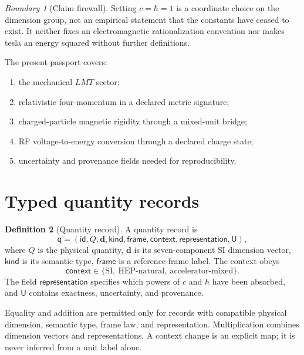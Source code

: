 \documentclass[11pt,a4paper]{article}
\theoremstyle{definition}
\newtheorem{definition}{Definition}[section]
\theoremstyle{plain}
\theoremstyle{remark}
\newtheorem{warning}[definition]{Boundary}
\newcommand{\SI}{\mathrm{SI}}
\newcommand{\HEP}{\mathrm{HEP}}
\begin{document}
\begin{warning}[Claim firewall]
Setting \(c=\hbar=1\) is a coordinate choice on the dimension group,
not an empirical statement that the constants have ceased to exist.
It neither fixes an electromagnetic rationalization convention nor
makes tesla an energy squared without further definitions.
\end{warning}

The present passport covers:
\begin{enumerate}[label=(\roman*)]
  \item the mechanical \(LMT\) sector;
  \item relativistic four-momentum in a declared metric signature;
  \item charged-particle magnetic rigidity through a mixed-unit bridge;
  \item RF voltage-to-energy conversion through a declared charge state;
  \item uncertainty and provenance fields needed for reproducibility.
\end{enumerate}

\section{Typed quantity records}

\begin{definition}[Quantity record]
A quantity record is
\[
\mathsf q=
(\mathsf{id},Q,\bm d,\mathsf{kind},\mathsf{frame},
 \mathsf{context},\mathsf{representation},\mathsf U),
\]
where \(Q\) is the physical quantity, \(\bm d\) is its seven-component
SI dimension vector, \(\mathsf{kind}\) is its semantic type,
\(\mathsf{frame}\) is a reference-frame label. The context obeys
\[
\mathsf{context}\in
\{\SI,\ \HEP\text{-natural},\ \text{accelerator-mixed}\}.
\]
The field \(\mathsf{representation}\) specifies which powers of
\(c\) and \(\hbar\) have been absorbed, and
\(\mathsf U\) contains exactness, uncertainty, and provenance.
\end{definition}

Equality and addition are permitted only for records with compatible
physical dimension, semantic type, frame law, and representation.
Multiplication combines dimension vectors and representations.
A context change is an explicit map; it is never inferred from a unit
label alone.
\end{document}

